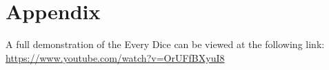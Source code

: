 \documentclass{sigchi}
\begin{document}





\section{Appendix}

A full demonstration of the Every Dice can be viewed at the following link:  \url{ https://www.youtube.com/watch?v=OrUFfBXyuI8}
\end{document}
